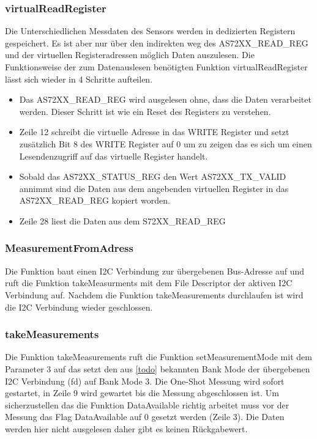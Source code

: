 \subsubsection{virtualReadRegister}
Die Unterschiedlichen Messdaten des Sensors werden in dedizierten Registern gespeichert.
 Es ist aber nur über den indirekten weg des AS72XX\_READ\_REG und der virtuellen Registeradressen möglich Daten auszulesen.
Die Funktionsweise der zum Datenauslesen benötigten Funktion virtualReadRegister lässt sich wieder in 4 Schritte aufteilen.
\begin{itemize}
	\item Das AS72XX\_READ\_REG wird ausgelesen ohne, dass die Daten verarbeitet werden. Dieser Schritt ist wie ein Reset des Registers zu verstehen.
	\item Zeile 12 schreibt die virtuelle Adresse in das WRITE Register und setzt zusätzlich Bit 8 des WRITE Register auf 0 um zu zeigen das es sich um einen Lesendenzugriff auf das virtuelle Register handelt.
	\item Sobald das AS72XX\_STATUS\_REG den Wert AS72XX\_TX\_VALID annimmt sind die Daten aus dem angebenden virtuellen Register in das AS72XX\_READ\_REG kopiert worden.
	\item Zeile 28 liest die Daten aus dem S72XX\_READ\_REG
\end{itemize}


\subsubsection{MeasurementFromAdress}
Die Funktion baut einen I2C Verbindung zur übergebenen Bus-Adresse auf und  ruft die Funktion takeMeasurments mit dem File Descriptor der aktiven I2C Verbindung auf.
Nachdem die Funktion takeMeasurements durchlaufen ist wird die I2C Verbindung wieder geschlossen.


\subsubsection{takeMeasurements}

Die Funktion takeMeasurements ruft die Funktion setMeasurementMode mit dem Parameter 3 auf das setzt den aus \ref{todo} bekannten Bank Mode der übergebenen I2C Verbindung (fd) auf Bank Mode 3.
	Die One-Shot Messung wird sofort gestartet, in Zeile 9 wird gewartet bis die Messung abgeschlossen ist. 
		Um sicherzustellen das die Funktion DataAvailable richtig arbeitet muss vor der Messung das Flag DataAvailable auf 0 gesetzt werden (Zeile 3).
Die Daten werden hier nicht ausgelesen daher gibt es keinen Rückgabewert.\\


